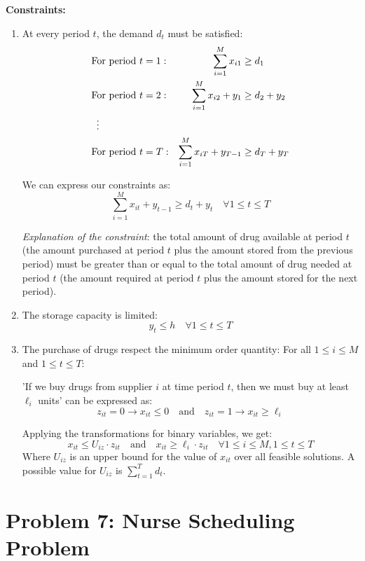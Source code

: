 \documentclass[a4paper,10pt]{article}
\begin{document}
\textbf{Constraints:} 
\begin{enumerate}
  \item At every period \(t\), the demand \(d_t\) must be satisfied:
    \begin{align*}
      &\text{For period } t=1: & \sum_{i=1}^M x_{i1} &\geq d_1 \\
      &\text{For period } t=2: & \sum_{i=1}^M x_{i2} + y_{1} &\geq d_2 + y_{2}\\
      &\vdotswithin{=} \\
      &\text{For period } t=T: & \sum_{i=1}^M x_{iT} + y_{T-1} &\geq d_T + y_{T}
    \end{align*}

  We can express our constraints as:
  \[\boxed{\sum_{i=1}^M x_{it} + y_{t-1} \geq d_t + y_t \quad \forall 1 \leq t \leq T}\]

  \textit{Explanation of the constraint}: the total amount of drug available at period \(t\) (the amount purchased at period \(t\) plus the amount stored from the previous period) must be greater than or equal to the total amount of drug needed at period \(t\) (the amount required at period \(t\) plus the amount stored for the next period).

  \item The storage capacity is limited:
  \[\boxed{y_t \leq h \quad \forall 1 \leq t \leq T}\]

  \item The purchase of drugs respect the minimum order quantity:
  For all \(1 \leq i \leq M\) and \(1 \leq t \leq T\):

  'If we buy drugs from supplier \(i\) at time period \(t\), then we must buy at least \(\ell_i\) units' can be expressed as:
  \[
    z_{it} = 0 \rightarrow x_{it} \leq 0 \quad \text{and} \quad z_{it} = 1 \rightarrow x_{it} \geq \ell_i
  \]

  Applying the transformations for binary variables, we get:
  \[
    \boxed{x_{it} \leq U_{iz} \cdot z_{it}} \quad \text{and} \quad \boxed{x_{it} \geq \ell_i \cdot z_{it}} \quad \forall 1 \leq i \leq M, 1 \leq t \leq T
  \]
  Where \(U_{iz}\) is an upper bound for the value of \(x_{it}\) over all feasible solutions. A possible value for \(U_{iz}\) is \(\sum_{t=1}^T d_t\).


\end{enumerate}


\newpage

\section*{Problem 7: Nurse Scheduling Problem}
\end{document}
